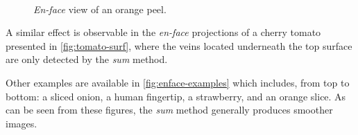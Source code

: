 \begin{figure}[H]
	\myfloatalign
	\\
	\caption{\emph{En-face} view of an orange peel.}\label{fig:tomato-surf}
\end{figure}

A similar effect is observable in the \emph{en-face} projections of a cherry tomato presented in \autoref{fig:tomato-surf}, where the veins located underneath the top surface are only detected by the \emph{sum} method.

Other examples are available in \autoref{fig:enface-examples} which includes, from top to bottom: a sliced onion, a human fingertip, a strawberry, and an orange slice. As can be seen from these figures, the \emph{sum} method generally produces smoother images. 

